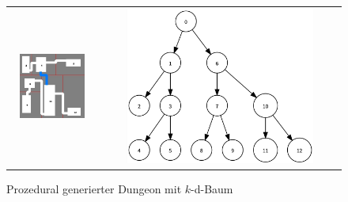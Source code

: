 \begin{figure}[h]
    \centering
    \begin{tabular}{cc}
        \begin{minipage}{.4\textwidth}
            \includegraphics[width = 0.8\textwidth]{resources/img/sp_ex_l3.jpeg}
        \end{minipage}
            &\begin{minipage}{.4\textwidth}
                \includegraphics[width = 0.8\textwidth]{resources/img/sp_ex_tree.png}
            \end{minipage}
    \end{tabular}
\caption{Prozedural generierter Dungeon mit $k$-d-Baum}
\label{04spdgdungeon}
\end{figure}